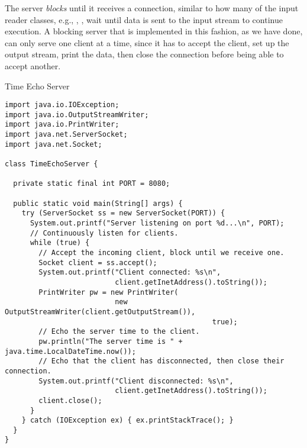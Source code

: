 
The server \textit{blocks} until it receives a connection, similar to how many of the input reader classes, e.g., , , wait until data is sent to the input stream to continue execution. A blocking server that is implemented in this fashion, as we have done, can only serve one client at a time, since it has to accept the client, set up the output stream, print the data, then close the connection before being able to accept another.

\begin{cl}[]{Time Echo Server}
\begin{lstlisting}[language=MyJava]
import java.io.IOException;
import java.io.OutputStreamWriter;
import java.io.PrintWriter;
import java.net.ServerSocket;
import java.net.Socket;

class TimeEchoServer {

  private static final int PORT = 8080;

  public static void main(String[] args) {
    try (ServerSocket ss = new ServerSocket(PORT)) {
      System.out.printf("Server listening on port %d...\n", PORT);
      // Continuously listen for clients.
      while (true) {
        // Accept the incoming client, block until we receive one.
        Socket client = ss.accept();
        System.out.printf("Client connected: %s\n", 
                          client.getInetAddress().toString());
        PrintWriter pw = new PrintWriter(
                          new OutputStreamWriter(client.getOutputStream()), 
                                                 true);
        // Echo the server time to the client.
        pw.println("The server time is " + java.time.LocalDateTime.now());
        // Echo that the client has disconnected, then close their connection.
        System.out.printf("Client disconnected: %s\n", 
                          client.getInetAddress().toString());
        client.close();
      }
    } catch (IOException ex) { ex.printStackTrace(); }
  }
}
\end{lstlisting}
\end{cl}

